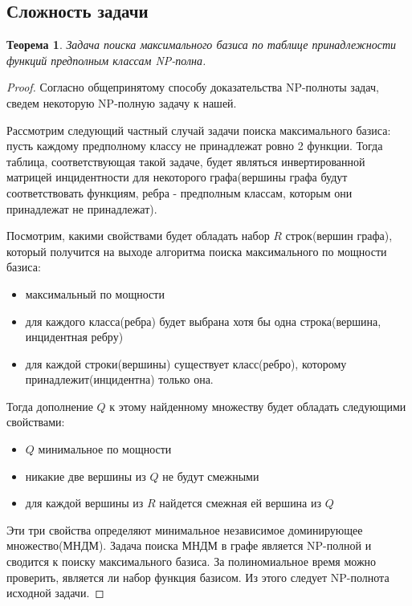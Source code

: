 \documentclass[a4paper,14pt]{extreport}
\newtheorem{thm}{Теорема}
\begin{document}
\subsection{Сложность задачи}
\begin{thm}
Задача поиска максимального базиса по таблице принадлежности функций предполным классам NP-полна.
\end{thm}
\begin{proof}
Согласно общепринятому способу доказательства NP-полноты задач, сведем некоторую NP-полную задачу к нашей.

Рассмотрим следующий частный случай задачи поиска максимального базиса: пусть каждому предполному классу не принадлежат ровно 2 функции. Тогда таблица, соответствующая такой задаче, будет являться инвертированной матрицей инцидентности для некоторого графа(вершины графа будут соответствовать функциям, ребра -  предполным классам, которым они принадлежат не принадлежат). 

Посмотрим, какими свойствами будет обладать набор $R$ строк(вершин графа), который получится на выходе алгоритма поиска максимального по мощности базиса:
\begin{itemize}
\item максимальный по мощности    
\item для каждого класса(ребра) будет выбрана хотя бы одна строка(вершина, инцидентная ребру)
\item для каждой строки(вершины) существует класс(ребро), которому принадлежит(инцидентна) только она.    
\end{itemize}

Тогда дополнение $Q$ к этому найденному множеству будет обладать следующими свойствами:
\begin{itemize}
\item $Q$ минимальное по мощности    
\item никакие две вершины из $Q$ не будут смежными
\item для каждой вершины из $R$ найдется смежная ей вершина из $Q$     
\end{itemize}

Эти три свойства определяют минимальное независимое доминирующее множество(МНДМ). Задача поиска МНДМ в графе является NP-полной и сводится к поиску максимального базиса. За полиномиальное время можно проверить, является ли набор функция базисом. Из этого следует NP-полнота исходной задачи. 
   


\end{proof}
\end{document}
